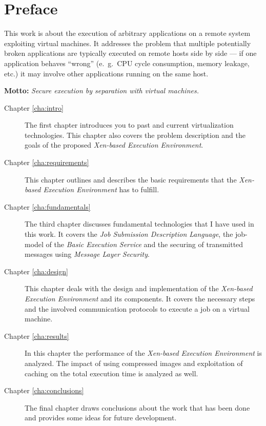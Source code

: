 
\chapter{Preface}
\thispagestyle{empty}

This work  is about  the execution of  arbitrary applications on  a remote
system exploiting virtual machines. It addresses the problem that multiple
potentially  broken applications  are typically  executed on  remote hosts
side by  side ---  if one application  behaves ``wrong''  (e.~g.~CPU cycle
consumption,  memory  leakage, etc.)  it  may  involve other  applications
running on the same host.

\textbf{Motto:} \emph{Secure execution by separation with virtual machines.}
\vfill

\begin{description}
\item[Chapter \ref{cha:intro}]  The first  chapter introduces you  to past
  and current  virtualization technologies.  This chapter  also covers the
  problem  description  and  the  goals of  the  proposed  \emph{Xen-based
    Execution Environment}.

\item[Chapter \ref{cha:requirements}] This  chapter outlines and describes
  the basic  requirements that the  \emph{Xen-based Execution Environment}
  has to fulfill.
  
\item[Chapter   \ref{cha:fundamentals}]   The   third  chapter   discusses
  fundamental technologies that  I have used in this  work.  It covers the
  \emph{Job  Submission  Description   Language},  the  job-model  of  the
  \emph{Basic Execution Service} and  the securing of transmitted messages
  using \emph{Message Layer Security}.
  
\item[Chapter  \ref{cha:design}] This  chapter deals  with the  design and
  implementation  of the  \emph{Xen-based Execution  Environment}  and its
  components. It covers the necessary steps and the involved communication
  protocols to execute a job on a virtual machine.
  
\item[Chapter \ref{cha:results}]  In this  chapter the performance  of the
  \emph{Xen-based Execution Environment} is  analyzed. The impact of using
  compressed  images and exploitation  of caching  on the  total execution
  time is analyzed as well.
  
\item[Chapter \ref{cha:conclusions}]  The final chapter  draws conclusions
  about the  work that has  been done and  provides some ideas  for future
  development.
\end{description}

\clearpage

